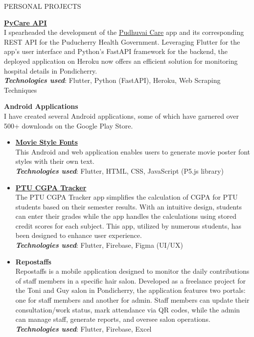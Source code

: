 \documentclass{template}
\begin{document}
\begin{rSection}{PERSONAL PROJECTS}

\textbf{\href{https://github.com/princesanjivy/pycare-api}{PyCare API}} \\
I spearheaded the development of the \href{https://sites.google.com/view/dscpec/pudhuvai-care}{Pudhuvai Care} app and its corresponding REST API for the Puducherry Health Government. Leveraging Flutter for the app's user interface and Python's FastAPI framework for the backend, the deployed application on Heroku now offers an efficient solution for monitoring hospital details in Pondicherry. \\
\textbf{\textit{Technologies used}}: Flutter, Python (FastAPI), Heroku, Web Scraping Techniques

\textbf{Android Applications} \\
I have created several Android applications, some of which have garnered over 500+ downloads on the Google Play Store.

\begin{itemize}

\item \textbf{\href{https://github.com/princesanjivy/moviestylefonts}{Movie Style Fonts}} \\ 
This Android and web application enables users to generate movie poster font styles with their own text. \\
\textbf{\textit{Technologies used}}: Flutter, HTML, CSS, JavaScript (P5.js library)

\item \textbf{\href{https://play.google.com/store/apps/details?id=com.princeappstudio.ptu_cgpa_tracker}{PTU CGPA Tracker}} \\ 
The PTU CGPA Tracker app simplifies the calculation of CGPA for PTU students based on their semester results. With an intuitive design, students can enter their grades while the app handles the calculations using stored credit scores for each subject. This app, utilized by numerous students, has been designed to enhance user experience. \\
\textbf{\textit{Technologies used}}: Flutter, Firebase, Figma (UI/UX)

\item \textbf{Repostaffs} \\ 
Repostaffs is a mobile application designed to monitor the daily contributions of staff members in a specific hair salon. Developed as a freelance project for the Toni and Guy salon in Pondicherry, the application features two portals: one for staff members and another for admin. Staff members can update their consultation/work status, mark attendance via QR codes, while the admin can manage staff, generate reports, and oversee salon operations. \\
\textbf{\textit{Technologies used}}: Flutter, Firebase, Excel


\end{itemize}
\end{rSection}
\end{document}
